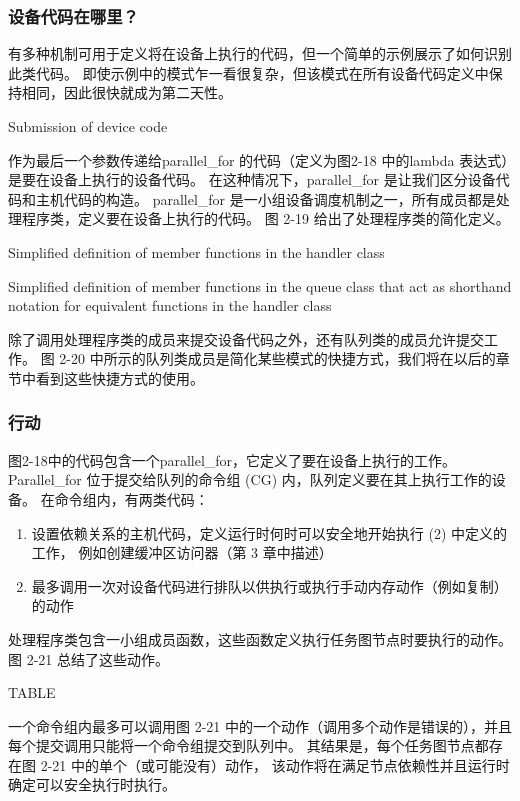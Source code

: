 \subsubsection{设备代码在哪里？}
有多种机制可用于定义将在设备上执行的代码，但一个简单的示例展示了如何识别此类代码。 
即使示例中的模式乍一看很复杂，但该模式在所有设备代码定义中保持相同，因此很快就成为第二天性。

{\color{red} Submission of device code }

作为最后一个参数传递给parallel\_for 的代码（定义为图2-18 中的lambda 表达式）是要在设备上执行的设备代码。 
在这种情况下，parallel\_for 是让我们区分设备代码和主机代码的构造。 
parallel\_for 是一小组设备调度机制之一，所有成员都是处理程序类，定义要在设备上执行的代码。 
图 2-19 给出了处理程序类的简化定义。

{\color{red} Simplified definition of member functions in the handler class }

{\color{red} Simplified definition of member functions in the queue class that act as shorthand notation for equivalent functions in the handler class}

除了调用处理程序类的成员来提交设备代码之外，还有队列类的成员允许提交工作。 
图 2-20 中所示的队列类成员是简化某些模式的快捷方式，我们将在以后的章节中看到这些快捷方式的使用。

\subsubsection{行动}
图2-18中的代码包含一个parallel\_for，它定义了要在设备上执行的工作。 
Parallel\_for 位于提交给队列的命令组 (CG) 内，队列定义要在其上执行工作的设备。 在命令组内，有两类代码：

\begin{enumerate}
	\item 设置依赖关系的主机代码，定义运行时何时可以安全地开始执行 (2) 中定义的工作，
	例如创建缓冲区访问器（第 3 章中描述）

	\item 最多调用一次对设备代码进行排队以供执行或执行手动内存动作（例如复制）的动作
\end{enumerate}

处理程序类包含一小组成员函数，这些函数定义执行任务图节点时要执行的动作。 图 2-21 总结了这些动作。

{\color{blue} TABLE }

一个命令组内最多可以调用图 2-21 中的一个动作（调用多个动作是错误的），并且每个提交调用只能将一个命令组提交到队列中。 
其结果是，每个任务图节点都存在图 2-21 中的单个（或可能没有）动作，
该动作将在满足节点依赖性并且运行时确定可以安全执行时执行。

